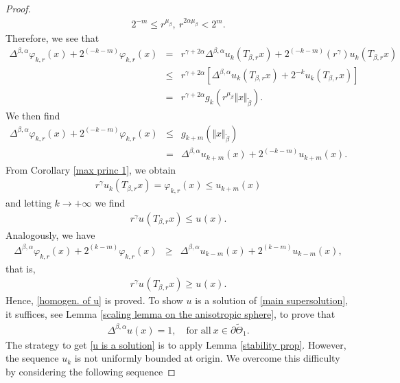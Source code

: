 \documentclass[10pt, leqno]{article}
\theoremstyle{definition}
\theoremstyle{remark}
\numberwithin{equation}{section}
\begin{document}
\begin{proof}
\begin{eqnarray}
\label{}
2^{-m} \leq r^{\mu_{\beta}}, \ r^{2\alpha \mu_{\beta}} < 2^{m}.
\end{eqnarray}
Therefore, we see that
\begin{eqnarray}
\Delta^{\beta, \alpha}\varphi_{k,r}(x) + 2^{\left(-k-m \right)}\varphi_{k,r}(x) & = & \nonumber r^{\gamma + 2\alpha}\Delta^{\beta, \alpha}u_{k}(T_{\beta,r}x) + 2^{\left(-k-m \right)}(r^{\gamma})u_{k}(T_{\beta,r}x) \\ \nonumber
& \leq & r^{\gamma + 2\alpha}\left[ \Delta^{\beta, \alpha}u_{k}(T_{\beta,r}x) + 2^{-k}u_{k}(T_{\beta,r}x) \right]\\ \nonumber
& = & r^{\gamma + 2\alpha}g_{k}(r^{\mu_{\beta}} \Vert x \Vert_{\tilde{\beta}}).
\end{eqnarray}
We then find
\begin{eqnarray}
\Delta^{\beta, \alpha}\varphi_{k,r}(x) + 2^{\left(-k-m \right)}\varphi_{k,r}(x) & \leq & \nonumber g_{k+m}(\Vert x \Vert_{\tilde{\beta}})\\
& = & \Delta^{\beta, \alpha}u_{k+m}(x) + 2^{\left(-k-m \right)}u_{k+m}(x).
\end{eqnarray}
From Corollary \ref{max princ 1}, we obtain
\begin{eqnarray}
r^{\gamma}u_{k}(T_{\beta,r}x) = \varphi_{k,r}(x) \leq u_{k+m}(x)
\end{eqnarray}
and letting $k \rightarrow +\infty$ we find
\begin{eqnarray}
r^{\gamma}u_{}(T_{\beta,r}x)\leq u_{}(x).
\end{eqnarray}
Analogously, we have
\begin{eqnarray}
\Delta^{\beta, \alpha}\varphi_{k,r}(x) + 2^{\left(k-m \right)}\varphi_{k,r}(x) & \geq &
\Delta^{\beta, \alpha}u_{k-m}(x) + 2^{\left(k-m \right)}u_{k-m}(x),
\end{eqnarray}
that is,
\begin{eqnarray}
r^{\gamma}u_{}(T_{\beta,r}x)\geq u_{}(x).
\end{eqnarray}
Hence, \eqref{homogen. of u} is proved. To show $u$ is a solution of \eqref{main supersolution}, it suffices, see Lemma \ref{scaling lemma on the anisotropic sphere}, to prove that
\begin{eqnarray}
\label{u is a solution}
\Delta^{\beta, \alpha}u(x) = 1, \quad \text{for all} \ x \in \partial \tilde{\Theta}_{1}.
\end{eqnarray}
The strategy to get \eqref{u is a solution} is to apply Lemma \ref{stability prop}. However, the sequence $u_{k}$ is not uniformly bounded at origin. We overcome this difficulty by considering the following sequence

\end{proof}
\end{document}
